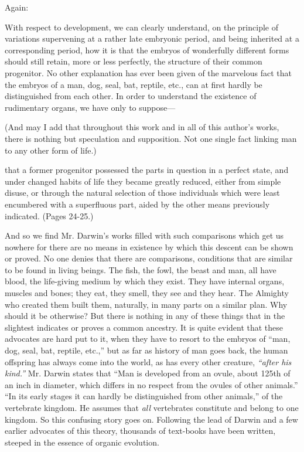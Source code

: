 Again:

With respect to development, we can clearly understand, on the principle of variations
supervening at a rather late embryonic period, and being inherited at a corresponding period,
how it is that the embryos of wonderfully different forms should still retain, more or less
perfectly, the structure of their common progenitor. No other explanation has ever been given
of the marvelous fact that the embryos of a man, dog, seal, bat, reptile, etc., can at first hardly
be distinguished from each other. In order to understand the existence of rudimentary organs,
we have only to suppose—

(And may I add that throughout this work and in all of this author's works, there is nothing
but speculation and supposition. Not one single fact linking man to any other form of life.)

that a former progenitor possessed the parts in question in a perfect state, and under changed
habits of life they became greatly reduced, either from simple disuse, or through the natural
selection of those individuals which were least encumbered with a superfluous part, aided by
the other means previously indicated. (Pages 24-25.)

And so we find Mr. Darwin's works filled with such comparisons which get us nowhere for
there are no means in existence by which this descent can be shown or proved. No one denies
that there are comparisons, conditions that are similar to be found in living beings. The fish,
the fowl, the beast and man, all have blood, the life-giving medium by which they exist. They
have internal organs, muscles and bones; they eat, they smell, they see and they hear. The
Almighty who created them built them, naturally, in many parts on a similar plan. Why
should it be otherwise? But there is nothing in any of these things that in the slightest
indicates or proves a common ancestry. It is quite evident that these advocates are hard put to
it, when they have to resort to the embryos of ``man, dog, seal, bat, reptile, etc.,'' but as far as
history of man goes back, the human offspring has always come into the world, as has every
other creature, \textit{``after his kind.''} Mr. Darwin states that ``Man is developed from an ovule,
about 125th of an inch in diameter, which differs in no respect from the ovules of other
animals.'' ``In its early stages it can hardly be distinguished from other animals,'' of the
vertebrate kingdom. He assumes that \textit{all} vertebrates constitute and belong to one kingdom.
So this confusing story goes on. Following the lead of Darwin and a few earlier advocates of
this theory, thousands of text-books have been written, steeped in the essence of organic
evolution.

